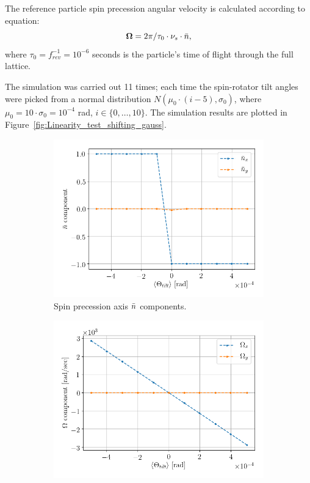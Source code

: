  The reference particle spin precession angular velocity is calculated 
 according to equation:~\cite[p.~4]{COSY:SpinTuneMapping}
\[
\boldsymbol{\Omega} = 2\pi/\tau_0\cdot \nu_s \cdot \bar n,
\]
where $\tau_0 = f^{-1}_{rev} = 10^{-6}$ seconds is the particle's time of flight through the full lattice.

The simulation was carried out 11 times; each time the spin-rotator tilt angles were picked
from a normal distribution $N(\mu_0\cdot(i-5), \sigma_0)$, where 
$\mu_0 = 10\cdot \sigma_0 = 10^{-4}$ rad, $i\in\lbrace0,\dots, 10\rbrace$. The simulation
results are plotted in Figure~\ref{fig:Linearity_test_shifting_gauss}.

\begin{figure}[!h]
	\centering
	\begin{subfigure}{\linewidth}
		\includegraphics[height=.35\paperheight]{images/fake_signal_sim/linearity_test_shifting_gauss_nbar}
		\caption{Spin precession axis $\bar n$ components.}
	\end{subfigure}
	\begin{subfigure}{\linewidth}
		\includegraphics[height=.35\paperheight]{images/fake_signal_sim/linearity_test_shifting_gauss_freq}

\end{subfigure}
\end{figure}
